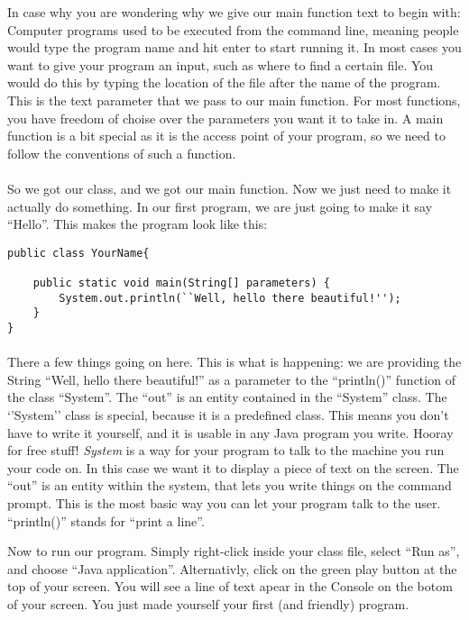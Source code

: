 \documentclass[11pt,fleqn]{book} %
\begin{document}
\begin{remark}
In case why you are wondering why we give our main function text to begin with:
Computer programs used to be executed from the command line, meaning people would type the program name and hit enter to start running it.
In most cases you want to give your program an input, such as where to find a certain file. You would do this by typing the location of the file after the name of the program.
This is the text parameter that we pass to our main function. For most functions, you have freedom of choise over the parameters you want it to take in. A main function is a bit special as it is the access point of your program, so we need to follow the conventions of such a function.
\end{remark}

\paragraph{} So we got our class, and we got our main function. Now we just need to make it actually do something. In our first program, we are just going to make it say ``Hello''.
This makes the program look like this:
\begin{lstlisting}[caption=YourName.java]
	public class YourName{

	public static void main(String[] parameters) {
		System.out.println(``Well, hello there beautiful!'');
	}	
}
\end{lstlisting}
\paragraph{}There a few things going on here. This is what is happening: we are providing the String ``Well, hello there beautiful!'' as a parameter to the ``println()'' function of the class ``System''.
The ``out'' is an entity contained in the ``System'' class. The `'System'' class is special, because it is a predefined class. This means you don't have to write it yourself, and it is usable in any Java program you write. Hooray for free stuff! \emph{System} is a way for your program to talk to the machine you run your code on. In this case we want it to display a piece of text on the screen. The ``out'' is an entity within the system, that lets you write things on the command prompt. This is the most basic way you can let your program talk to the user.
``println()'' stands for ``print a line''.

 Now to run our program. Simply right-click inside your class file, select ``Run as'', and choose ``Java application''. Alternativly, click on the green play button at the top of your screen. You will see a line of text apear in the Console on the botom of your screen. You just made yourself your first (and friendly) program.
\end{document}
